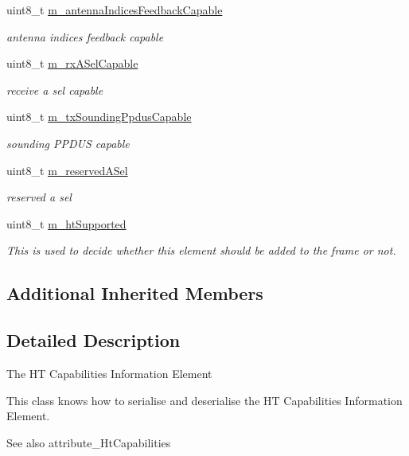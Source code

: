 \begin{DoxyCompactItemize}
uint8\+\_\+t \hyperlink{classns3_1_1HtCapabilities_acdcdd4c167f12e39628a4bd07c74480a}{m\+\_\+antenna\+Indices\+Feedback\+Capable}
\begin{DoxyCompactList}\small\item\em antenna indices feedback capable \end{DoxyCompactList}\item 
uint8\+\_\+t \hyperlink{classns3_1_1HtCapabilities_abb1269e0c1dc2ee42a53061e8b24cd1c}{m\+\_\+rx\+A\+Sel\+Capable}
\begin{DoxyCompactList}\small\item\em receive a sel capable \end{DoxyCompactList}\item 
uint8\+\_\+t \hyperlink{classns3_1_1HtCapabilities_a3f5f8334d2821840cb0654280ef239c6}{m\+\_\+tx\+Sounding\+Ppdus\+Capable}
\begin{DoxyCompactList}\small\item\em sounding P\+P\+D\+US capable \end{DoxyCompactList}\item 
uint8\+\_\+t \hyperlink{classns3_1_1HtCapabilities_af9f5027f3ed34e485a5edad6142ffd3f}{m\+\_\+reserved\+A\+Sel}
\begin{DoxyCompactList}\small\item\em reserved a sel \end{DoxyCompactList}\item 
uint8\+\_\+t \hyperlink{classns3_1_1HtCapabilities_ac513840270788d2b42800e8ed32f74b9}{m\+\_\+ht\+Supported}
\begin{DoxyCompactList}\small\item\em This is used to decide whether this element should be added to the frame or not. \end{DoxyCompactList}\end{DoxyCompactItemize}
\subsection*{Additional Inherited Members}


\subsection{Detailed Description}
The HT Capabilities Information Element

This class knows how to serialise and deserialise the HT Capabilities Information Element. 

\begin{DoxySeeAlso}{See also}
attribute\+\_\+\+Ht\+Capabilities 
\end{DoxySeeAlso}


